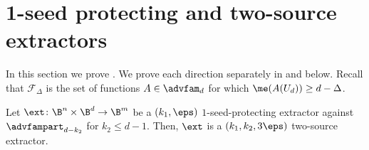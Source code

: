 \section{1-seed protecting and two-source extractors}\label{sec:two source}

In this section we prove . We prove each direction separately in  and  below. Recall that $\mathcal{F}_{\Delta}$ is the set of functions $A \in \advfam_d$ for which $\me(A(U_d)) \ge d-\Delta$.

\begin{lemma}\label{lem: sp is ts}
Let  $\ext \colon \B^{n} \times \B^{d} \rightarrow \B^{m}$ be a $(k_1,\eps)$ $1$-seed-protecting extractor against $\advfampart_{d-k_2}$ for $k_2\leq d-1$. Then, $\ext$ is a $(k_1,k_2, 3\eps)$ two-source extractor.
\end{lemma}
%

